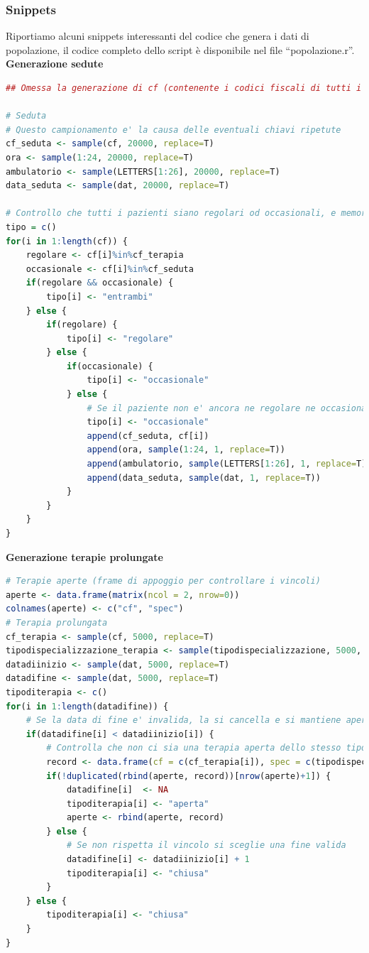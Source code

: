 \documentclass[11pt]{article}
\begin{document}
\subsubsection{Snippets}
Riportiamo alcuni snippets interessanti del codice che genera i dati di popolazione, il codice completo dello script è disponibile nel file ``popolazione.r''.\\

\textbf{Generazione sedute}
\begin{lstlisting}[language=R]
## Omessa la generazione di cf (contenente i codici fiscali di tutti i pazienti) e cf_terapia (contenente i codici dei pazienti in terapia prolungata)

# Seduta
# Questo campionamento e' la causa delle eventuali chiavi ripetute
cf_seduta <- sample(cf, 20000, replace=T)
ora <- sample(1:24, 20000, replace=T)
ambulatorio <- sample(LETTERS[1:26], 20000, replace=T)
data_seduta <- sample(dat, 20000, replace=T)

# Controllo che tutti i pazienti siano regolari od occasionali, e memorizzo l'informazione su un array
tipo = c()
for(i in 1:length(cf)) {
    regolare <- cf[i]%in%cf_terapia
    occasionale <- cf[i]%in%cf_seduta
    if(regolare && occasionale) {
        tipo[i] <- "entrambi"
    } else {
        if(regolare) {
            tipo[i] <- "regolare"
        } else {
            if(occasionale) {
                tipo[i] <- "occasionale"
            } else {
                # Se il paziente non e' ancora ne regolare ne occasionale, aggiungo una seduta rendendolo occasionale
                tipo[i] <- "occasionale"
                append(cf_seduta, cf[i])
                append(ora, sample(1:24, 1, replace=T))
                append(ambulatorio, sample(LETTERS[1:26], 1, replace=T))
                append(data_seduta, sample(dat, 1, replace=T))
            }
        }
    }
}
\end{lstlisting}

\textbf{Generazione terapie prolungate}
\begin{lstlisting}[language=R]
# Terapie aperte (frame di appoggio per controllare i vincoli)
aperte <- data.frame(matrix(ncol = 2, nrow=0))
colnames(aperte) <- c("cf", "spec")
# Terapia prolungata
cf_terapia <- sample(cf, 5000, replace=T)
tipodispecializzazione_terapia <- sample(tipodispecializzazione, 5000, replace=T)
datadiinizio <- sample(dat, 5000, replace=T)
datadifine <- sample(dat, 5000, replace=T)
tipoditerapia <- c()
for(i in 1:length(datadifine)) {
    # Se la data di fine e' invalida, la si cancella e si mantiene aperta la terapia
    if(datadifine[i] < datadiinizio[i]) {
        # Controlla che non ci sia una terapia aperta dello stesso tipo per lo stesso paziente
        record <- data.frame(cf = c(cf_terapia[i]), spec = c(tipodispecializzazione_terapia[i]))
        if(!duplicated(rbind(aperte, record))[nrow(aperte)+1]) {
            datadifine[i]  <- NA
            tipoditerapia[i] <- "aperta"
            aperte <- rbind(aperte, record)
        } else {
            # Se non rispetta il vincolo si sceglie una fine valida
            datadifine[i] <- datadiinizio[i] + 1
            tipoditerapia[i] <- "chiusa"
        }
    } else {
        tipoditerapia[i] <- "chiusa"
    }
}
\end{lstlisting}
\end{document}
